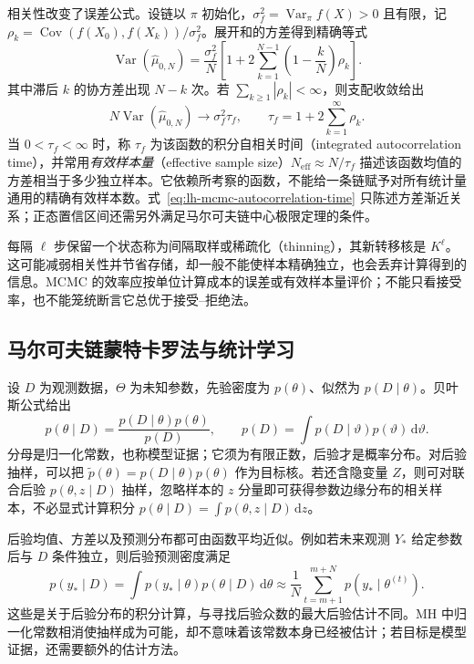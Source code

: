相关性改变了误差公式。设链以 $\pi$ 初始化，$\sigma_f^2=\operatorname{Var}_\pi f(X)>0$ 且有限，记
$\rho_k=\operatorname{Cov}(f(X_0),f(X_k))/\sigma_f^2$。展开和的方差得到精确等式
\begin{equation}
\operatorname{Var}(\widehat\mu_{0,N})
=\frac{\sigma_f^2}{N}
\left[1+2\sum_{k=1}^{N-1}\left(1-\frac{k}{N}\right)\rho_k\right].
\label{eq:lh-mcmc-correlated-variance}
\end{equation}
其中滞后 $k$ 的协方差出现 $N-k$ 次。若 $\sum_{k\geq1}|\rho_k|<\infty$，则支配收敛给出
\begin{equation}
N\operatorname{Var}(\widehat\mu_{0,N})\longrightarrow
\sigma_f^2\tau_f,\qquad
\tau_f=1+2\sum_{k=1}^{\infty}\rho_k.
\label{eq:lh-mcmc-autocorrelation-time}
\end{equation}
当 $0<\tau_f<\infty$ 时，称 $\tau_f$ 为该函数的积分自相关时间（integrated autocorrelation time），并常用\emph{有效样本量}（effective sample size）$N_{\mathrm{eff}}\approx N/\tau_f$ 描述该函数均值的方差相当于多少独立样本。它依赖所考察的函数，不能给一条链赋予对所有统计量通用的精确有效样本数。式~\eqref{eq:lh-mcmc-autocorrelation-time} 只陈述方差渐近关系；正态置信区间还需另外满足马尔可夫链中心极限定理的条件。

每隔 $\ell$ 步保留一个状态称为间隔取样或稀疏化（thinning），其新转移核是 $K^\ell$。这可能减弱相关性并节省存储，却一般不能使样本精确独立，也会丢弃计算得到的信息。MCMC 的效率应按单位计算成本的误差或有效样本量评价；不能只看接受率，也不能笼统断言它总优于接受--拒绝法。

\subsection{马尔可夫链蒙特卡罗法与统计学习}
\label{subsec:lh-mcmc-statistical-learning}

设 $D$ 为观测数据，$\Theta$ 为未知参数，先验密度为 $p(\theta)$、似然为 $p(D\mid\theta)$。贝叶斯公式给出
\begin{equation}
p(\theta\mid D)
=\frac{p(D\mid\theta)p(\theta)}{p(D)},
\qquad
p(D)=\int p(D\mid\vartheta)p(\vartheta)\,\mathrm d\vartheta.
\label{eq:lh-mcmc-bayes}
\end{equation}
分母是归一化常数，也称模型证据；它须为有限正数，后验才是概率分布。对后验抽样，可以把 $\widetilde p(\theta)=p(D\mid\theta)p(\theta)$ 作为目标核。若还含隐变量 $Z$，则可对联合后验 $p(\theta,z\mid D)$ 抽样，忽略样本的 $z$ 分量即可获得参数边缘分布的相关样本，不必显式计算积分 $p(\theta\mid D)=\int p(\theta,z\mid D)\,\mathrm dz$。

后验均值、方差以及预测分布都可由函数平均近似。例如若未来观测 $Y_*$ 给定参数后与 $D$ 条件独立，则后验预测密度满足
\begin{equation}
p(y_*\mid D)=\int p(y_*\mid\theta)p(\theta\mid D)\,\mathrm d\theta
\approx\frac1N\sum_{t=m+1}^{m+N}p(y_*\mid\theta^{(t)}).
\label{eq:lh-mcmc-posterior-prediction}
\end{equation}
这些是关于后验分布的积分计算，与寻找后验众数的最大后验估计不同。MH 中归一化常数相消使抽样成为可能，却不意味着该常数本身已经被估计；若目标是模型证据，还需要额外的估计方法。

